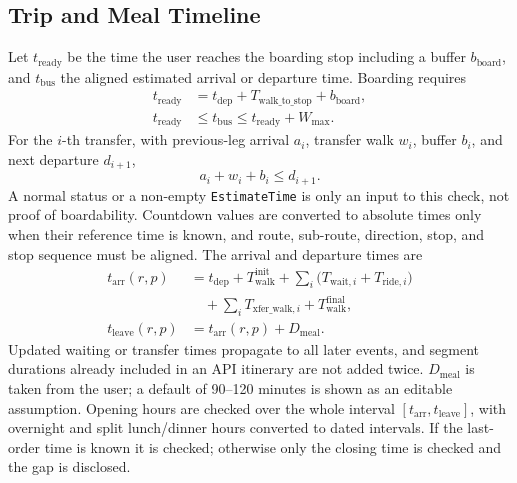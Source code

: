 \documentclass[conference]{IEEEtran}
\begin{document}
\subsection{Trip and Meal Timeline}
Let $t_{\mathrm{ready}}$ be the time the user reaches the boarding stop including a buffer $b_{\mathrm{board}}$, and $t_{\mathrm{bus}}$ the aligned estimated arrival or departure time. Boarding requires
\begin{equation}\label{eq:boarding}
\begin{aligned}
t_{\mathrm{ready}} &= t_{\mathrm{dep}}+T_{\mathrm{walk\_to\_stop}}+b_{\mathrm{board}},\\
t_{\mathrm{ready}} &\le t_{\mathrm{bus}}\le t_{\mathrm{ready}}+W_{\max}.
\end{aligned}
\end{equation}
For the $i$-th transfer, with previous-leg arrival $a_i$, transfer walk $w_i$, buffer $b_i$, and next departure $d_{i+1}$,
\begin{equation}\label{eq:transfer}
a_i+w_i+b_i\le d_{i+1}.
\end{equation}
A normal status or a non-empty \texttt{EstimateTime} is only an input to this check, not proof of boardability. Countdown values are converted to absolute times only when their reference time is known, and route, sub-route, direction, stop, and stop sequence must be aligned. The arrival and departure times are
\begin{equation}\label{eq:timeline}
\begin{aligned}
t_{\mathrm{arr}}(r,p) &= t_{\mathrm{dep}}+T_{\mathrm{walk}}^{\mathrm{init}}+\textstyle\sum_i\big(T_{\mathrm{wait},i}+T_{\mathrm{ride},i}\big)\\
&\quad+\textstyle\sum_i T_{\mathrm{xfer\_walk},i}+T_{\mathrm{walk}}^{\mathrm{final}},\\
t_{\mathrm{leave}}(r,p) &= t_{\mathrm{arr}}(r,p)+D_{\mathrm{meal}} .
\end{aligned}
\end{equation}
Updated waiting or transfer times propagate to all later events, and segment durations already included in an API itinerary are not added twice. $D_{\mathrm{meal}}$ is taken from the user; a default of 90--120 minutes is shown as an editable assumption. Opening hours are checked over the whole interval $[t_{\mathrm{arr}},t_{\mathrm{leave}}]$, with overnight and split lunch/dinner hours converted to dated intervals. If the last-order time is known it is checked; otherwise only the closing time is checked and the gap is disclosed.
\end{document}
